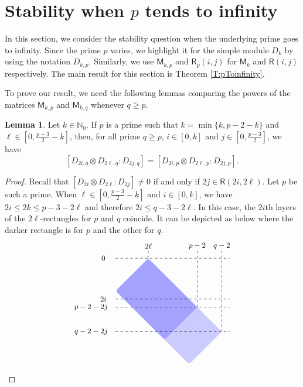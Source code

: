\documentclass[12pt,reqno]{amsart}
\newcommand{\NN}{\mathbb{N}}
\newcommand{\Rect}{\mathsf{R}}
\renewcommand{\geq}{\geqslant}
\renewcommand{\leq}{\leqslant}
\newcommand{\M}{\mathsf{M}}
\theoremstyle{definition}
\newtheorem{lem}[thm]{Lemma}
\numberwithin{equation}{section}
\begin{document}
\section{Stability when $p$ tends to infinity}\label{S:Stability}

In this section, we consider the stability question when the underlying prime goes to infinity. Since the prime $p$ varies, we highlight it for the simple module $D_k$ by using the notation $D_{k,p}$. Similarly, we use $\M_{k,p}$ and $\Rect_p(i,j)$ for $\M_k$ and $\Rect(i,j)$ respectively. The main result for this section is Theorem \ref{T:pToinfinity}.

To prove our result, we need the following lemmas comparing the powers of the matrices $\M_{k,p}$ and $\M_{k,q}$ whenever $q\geq p$. 

\begin{lem}\label{L:D Stability}
  Let $k\in\NN_0$. If $p$ is a prime such that $k=\min\{k,p-2-k\}$ and $\ell \in [0,\frac{p-3}{2}-k]$, then, for all prime $q\geq p$, $i\in [0,k]$ and $j \in [0,\frac{p-3}{2}]$, we have \[[D_{2i,q}\otimes D_{2\ell,q}:D_{2j,q}]=[D_{2i,p}\otimes D_{2\ell,p}:D_{2j,p}].\] 
\end{lem}
\begin{proof}
  Recall that $[D_{2i}\otimes D_{2\ell}:D_{2j}]\neq 0$ if and only if $2j \in \Rect(2i,2\ell)$. Let $p$ be such a prime. When $\ell \in [0,\frac{p-3}{2}-k]$ and $i\in [0,k]$, we have $2i\leq 2k\leq p-3-2\ell$ and therefore $2i\leq q-3-2\ell$. In this case, the $2i$th layers of the $2\ell$-rectangles for $p$ and $q$ coincide. It can be depicted as below where the darker rectangle is for $p$ and the other for $q$.
\[\small{
\begin{tikzpicture}[xscale=.35,yscale=.35]
\fill[blue,rounded corners=1mm,opacity=0.2] (0,0)--(4,4)--(10,-2)--(6,-6)--(0,0)--(4,4)--cycle;
\fill[blue,rounded corners=1mm,opacity=0.2] (0,0)--(4,4)--(13,-5)--(9,-9)--(0,0)--(4,4)--cycle;

\draw[dashed] (4,4)--(4,5);
\node at (4,5.5) {$2\ell$};
\draw[dashed] (10,-2)--(10,5);
\node at (10,5.5) {$p-2$};
\draw[dashed] (13,-5)--(13,5);
\node at (13,5.5) {$q-2$};
\draw[dashed] (0,-2)--(14,-2);
\node at (-3,-2) {$p-2-2j$};
\draw[dashed] (0,-1)--(14,-1);
\node at (-1.5,-1) {$2i$};
\draw[dashed] (0,4)--(14,4);
\node at (-1.5,4) {$0$};
\draw[dashed] (0,-5)--(14,-5);
\node at (-3,-5) {$q-2-2j$};
\end{tikzpicture}}\]
\end{proof}
\end{document}
